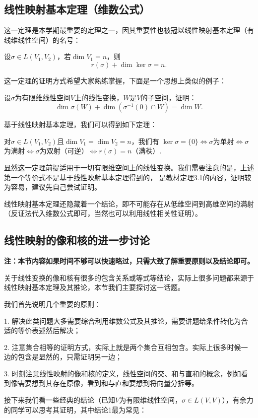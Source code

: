 \subsection{线性映射基本定理（维数公式）}
这一定理是本学期最重要的定理之一，因其重要性也被冠以线性映射基本定理（有线维线性空间）的名号：
\begin{theorem}
	设$\sigma \in L(V_1,V_2)$，若$\dim V_1=n$，则
	$$r(\sigma)+\dim\ker\sigma=n.$$
\end{theorem}
这一定理的证明方式希望大家熟练掌握，下面是一个思想上类似的例子：
\begin{example}
	设$\sigma$为有限维线性空间$V$上的线性变换，$W$是$V$的子空间，证明：
	$$\dim\sigma(W)+\dim(\sigma^{-1}(0) \cap W)=\dim W.$$
\end{example}
基于线性映射基本定理，我们可以得到如下定理：
\begin{theorem}
	对$\sigma \in L(V_1,V_2)$且$\dim V_1=\dim V_2=n$，我们有
	$\ker\sigma=\{0\}\iff \sigma$为单射$\iff \sigma$为满射$\iff \sigma$为双射（可逆）$\iff r(\sigma)=n$（满秩）.
\end{theorem}
显然这一定理前提适用于一切有限维空间上的线性变换。我们需要注意的是，上述第一个等价式不是基于线性映射基本定理得到的，
是教材定理3.1的内容，证明较为容易，建议先自己尝试证明。

线性映射基本定理还隐藏着一个结论，即不可能存在从低维空间到高维空间的满射（反证法代入维数公式即可，当然也可以利用线性相关性证明）。
\subsection{线性映射的像和核的进一步讨论}
\textbf{注：本节内容如果时间不够可以快速略过，只需大致了解重要原则以及结论即可。}

关于线性变换的像和核有很多的包含关系或等式等结论，实际上很多问题都来源于线性映射基本定理及其推论，本节我们主要探讨这一话题。

我们首先说明几个重要的原则：

1. 解决此类问题大多需要综合利用维数公式及其推论，需要讲题给条件转化为合适的等价表述然后解决；

2. 注意集合相等的证明方式，实际上就是两个集合互相包含。实际上很多时候一边的包含是显然的，只需证明另一边；

3. 时刻注意线性映射的像和核的定义，线性空间的交、和与直和的概念，例如看到像需要想到其存在原像，看到和与直和要想到将向量分拆等。

接下来我们看一些经典的结论（已知$V$为有限维线性空间，$\sigma\in L(V,V)$），有余力的同学可以思考其证明，其中结论1最为常见：

